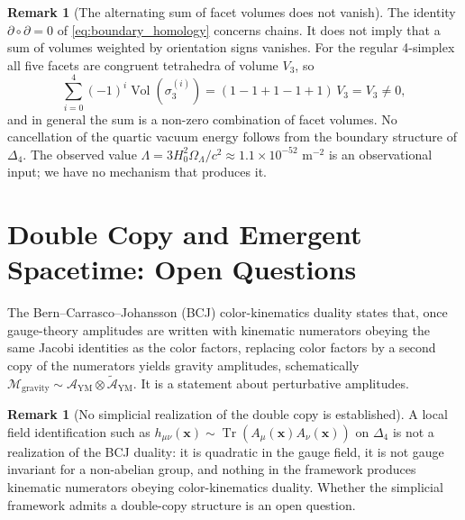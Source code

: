 \documentclass[11pt,a4paper,reqno]{amsart}
\theoremstyle{definition}
\newtheorem{remark}[theorem]{Remark}
\numberwithin{equation}{section}
\newcommand{\Tr}{\operatorname{Tr}}
\newcommand{\Vol}{\operatorname{Vol}}
\begin{document}
\begin{remark}[The alternating sum of facet volumes does not vanish]
\label{rem:vacuum_cancellation}
The identity $\partial \circ \partial = 0$ of \eqref{eq:boundary_homology} concerns chains. It does not imply that a sum of volumes weighted by orientation signs vanishes. For the regular 4-simplex all five facets are congruent tetrahedra of volume $V_3$, so
\begin{equation}
    \label{eq:quartic_cancellation}
    \sum_{i=0}^4 (-1)^i \Vol(\sigma_3^{(i)}) = (1 - 1 + 1 - 1 + 1)\, V_3 = V_3 \ne 0,
\end{equation}
and in general the sum is a non-zero combination of facet volumes. No cancellation of the quartic vacuum energy follows from the boundary structure of $\Delta_4$. The observed value $\Lambda = 3 H_0^2 \Omega_\Lambda/c^2 \approx 1.1 \times 10^{-52}\text{ m}^{-2}$ is an observational input; we have no mechanism that produces it.
\end{remark}

\section{Double Copy and Emergent Spacetime: Open Questions}
\label{sec:bcj_double_copy}

The Bern--Carrasco--Johansson (BCJ) color-kinematics duality \cite{bern2008new} states that, once gauge-theory amplitudes are written with kinematic numerators obeying the same Jacobi identities as the color factors, replacing color factors by a second copy of the numerators yields gravity amplitudes, schematically $\mathcal{M}_{\mathrm{gravity}} \sim \mathcal{A}_{\mathrm{YM}} \otimes \widetilde{\mathcal{A}}_{\mathrm{YM}}$. It is a statement about perturbative amplitudes.

\begin{remark}[No simplicial realization of the double copy is established]
A local field identification such as $h_{\mu\nu}(\mathbf{x}) \sim \Tr\left( A_\mu(\mathbf{x}) A_\nu(\mathbf{x}) \right)$ on $\Delta_4$ is not a realization of the BCJ duality: it is quadratic in the gauge field, it is not gauge invariant for a non-abelian group, and nothing in the framework produces kinematic numerators obeying color-kinematics duality. Whether the simplicial framework admits a double-copy structure is an open question.
\end{remark}
\end{document}
